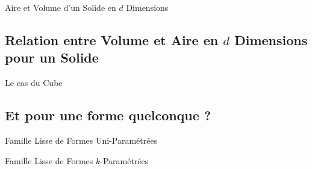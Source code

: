 \documentclass{beamercours}
\begin{document}
            \begin{frame}{Aire et Volume d'un Solide en $d$ Dimensions}
                
            \end{frame}

        \subsection{Relation entre Volume et Aire en $d$ Dimensions pour un Solide}
            \begin{frame}{Le cas du Cube}
                
            \end{frame}


        \subsection{Et pour une forme quelconque ?}
            \begin{frame}{Famille Lisse de Formes Uni-Paramétrées}
                
            \end{frame}

            \begin{frame}{Famille Lisse de Formes $k$-Paramétrées}
                
            \end{frame}
\end{document}
